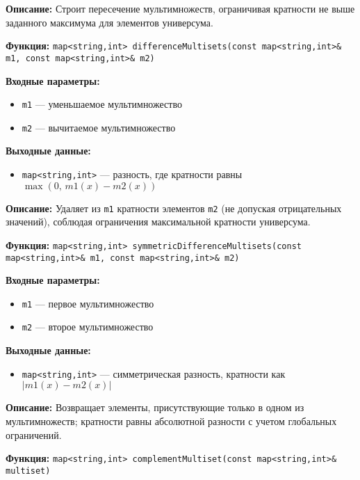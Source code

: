 \documentclass[12pt,a4paper]{article}
\begin{document}
\textbf{Описание:} Строит пересечение мультимножеств, ограничивая кратности не выше заданного максимума для элементов универсума.

\vspace{6pt}

\textbf{Функция:} \texttt{map<string,int> differenceMultisets(const map<string,int>\& m1, const map<string,int>\& m2)}

\textbf{Входные параметры:}
\begin{itemize}
    \item \texttt{m1} — уменьшаемое мультимножество
    \item \texttt{m2} — вычитаемое мультимножество
\end{itemize}

\textbf{Выходные данные:}
\begin{itemize}
    \item \texttt{map<string,int>} — разность, где кратности равны $\max(0,\,m1(x)-m2(x))$
\end{itemize}

\textbf{Описание:} Удаляет из \texttt{m1} кратности элементов \texttt{m2} (не допуская отрицательных значений), соблюдая ограничения максимальной кратности универсума.

\vspace{6pt}

\textbf{Функция:} \texttt{map<string,int> symmetricDifferenceMultisets(const map<string,int>\& m1, const map<string,int>\& m2)}

\textbf{Входные параметры:}
\begin{itemize}
    \item \texttt{m1} — первое мультимножество
    \item \texttt{m2} — второе мультимножество
\end{itemize}

\textbf{Выходные данные:}
\begin{itemize}
    \item \texttt{map<string,int>} — симметрическая разность, кратности как $|m1(x)-m2(x)|$
\end{itemize}

\textbf{Описание:} Возвращает элементы, присутствующие только в одном из мультимножеств; кратности равны абсолютной разности с учетом глобальных ограничений.

\vspace{6pt}

\textbf{Функция:} \texttt{map<string,int> complementMultiset(const map<string,int>\& multiset)}
\end{document}
